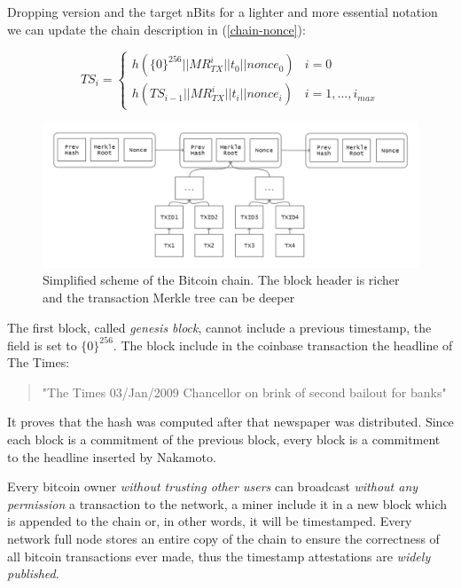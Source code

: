Dropping version and the target nBits for a lighter and more essential notation we can update the chain description in (\ref{chain-nonce}):

\begin{equation}
TS_i =  
\begin{cases} 
h(\{0\}^{256}||MR_{TX}^i||t_0||nonce_0) & i=0\\ 
h(TS_{i-1}||MR_{TX}^i||t_i||nonce_i) & i=1, ..., i_{max} 
\end{cases}
\end{equation}

\begin{figure}
	\begin{center}
		\includegraphics[width=\linewidth]{Images/bitcoin-chain-tx.png}
		\caption[Simplified scheme of the Bitcoin chain.]{Simplified scheme of the Bitcoin chain. The block header is richer and the transaction Merkle tree can be deeper}
		\label{fig:tx-chain}
	\end{center}
\end{figure}

The first block, called \textit{genesis block}, cannot include a previous timestamp, the field is set to $\{0\}^{256}$. The block include in the coinbase transaction the headline of The Times:
\begin{quotation}
"The Times 03/Jan/2009 Chancellor on brink of second bailout for banks"
\end{quotation}
It proves that the hash was computed after that newspaper was distributed. 
Since each block is a commitment of the previous block, every block is a commitment to the headline inserted by Nakamoto.

Every bitcoin owner \textit{without trusting other users} can broadcast \textit{without any permission} a transaction to the network, a miner include it in a new block which is appended to the chain or, in other words, it will be timestamped. Every network full node stores an entire copy of the chain to ensure the correctness of all bitcoin transactions ever made, thus the timestamp attestations are \textit{widely published}.  


